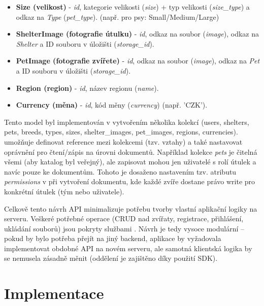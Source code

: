 \documentclass[czech, bp, kiv, he, iso690numb, pdf]{fasthesis}
\begin{document}
\begin{itemize}
        \item \textbf{Size (velikost)} - \textit{id}, kategorie velikosti (\textit{size}) + typ velikosti (\textit{size\_type}) a odkaz na \textit{Type} (\textit{pet\_type}). (např. pro psy: Small/Medium/Large)

        \item \textbf{ShelterImage (fotografie útulku)} - \textit{id}, odkaz na soubor (\textit{image}), odkaz na \textit{Shelter} a ID souboru v úložišti (\textit{storage\_id}).

        \item \textbf{PetImage (fotografie zvířete)} - \textit{id}, odkaz na soubor (\textit{image}), odkaz na \textit{Pet} a ID souboru v úložišti (\textit{storage\_id}).

        \item \textbf{Region (region)} - \textit{id}, název regionu (\textit{name}).

        \item \textbf{Currency (měna)} - \textit{id}, kód měny (\textit{currency}) (např. 'CZK').
    \end{itemize}

    Tento model byl implementován v  vytvořením několika kolekcí (users, shelters, pets, breeds, types, sizes, shelter\_images, pet\_images, regions, currencies).  umožňuje definovat reference mezi kolekcemi (tzv. vztahy) a také nastavovat oprávnění pro čtení/zápis na úrovni dokumentů. Například kolekce \textit{pets} je čitelná všemi (aby katalog byl veřejný), ale zapisovat mohou jen uživatelé s rolí útulek a navíc pouze ke  dokumentům. Tohoto je dosaženo nastavením tzv. atributu \textit{permissions} v  při vytvoření dokumentu, kde každé zvíře dostane právo write pro konkrétní útulek (tým nebo uživatele).

    Celkově tento návrh API minimalizuje potřebu tvorby vlastní aplikační logiky na serveru. Veškeré potřebné operace (CRUD nad zvířaty, registrace, přihlášení, ukládání souborů) jsou pokryty službami . Návrh je tedy vysoce modulární – pokud by bylo potřeba přejít na jiný backend, aplikace by vyžadovala implementovat obdobné API na novém serveru, ale samotná klientská logika by se nemusela zásadně měnit (oddělení je zajištěno díky použití SDK).





    \chapter{Implementace}
\end{document}
